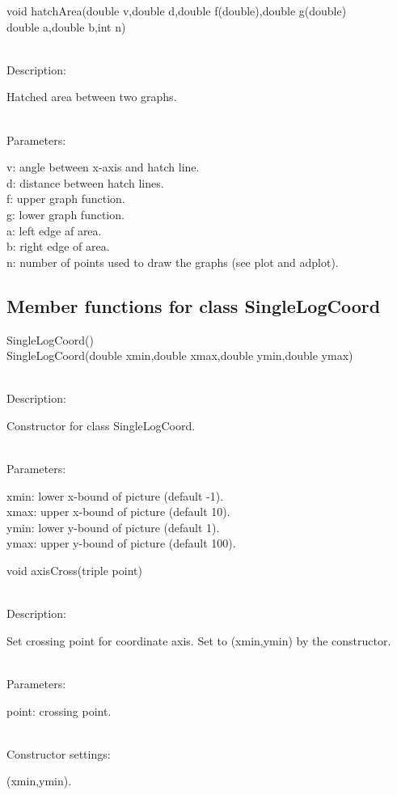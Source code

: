 \documentclass[12pt,a4paper]{article}
\newcommand{\memberitem}[1]{
                              \vspace{-0.5pc}
                              \end{minipage}\\
                              \phantom{M}#1:\\
                              \phantom{MM}
                              \begin{minipage}[t]{12cm}

                           }
\newcommand{\memdsc}{\memberitem{Description}}
\newcommand{\meminp}{\memberitem{Parameters}}
\newcommand{\memdef}{\memberitem{Constructor settings}}
\newenvironment{MemberDescr}
  {
    \begin{minipage}{15cm}
    \bf
  }
  {
    \end{minipage}
  }
\begin{document}
  \begin{MemberDescr}
    void hatchArea(double v,double d,double f(double),double g(double)\\
    \phantom{void hatchArea(}double a,double b,int n)\\
    \memdsc
      Hatched area between two graphs.\\
    \meminp
      v: angle between x-axis and hatch line.\\
      d: distance between hatch lines.\\
      f: upper graph function.\\
      g: lower graph function.\\
      a: left edge af area.\\
      b: right edge of area.\\
      n: number of points used to draw the graphs (see plot and adplot).\\
  \end{MemberDescr}

  \subsection{Member functions for class SingleLogCoord}

  \begin{MemberDescr}
    SingleLogCoord()\\
    SingleLogCoord(double xmin,double xmax,double ymin,double ymax)\\
    \memdsc
      Constructor for class SingleLogCoord.\\
    \meminp
      xmin: lower x-bound of picture (default -1).\\
      xmax: upper x-bound of picture (default 10).\\
      ymin: lower y-bound of picture (default 1).\\
      ymax: upper y-bound of picture (default 100).\\
  \end{MemberDescr}

  \begin{MemberDescr}
    void axisCross(triple point)\\
    \memdsc
      Set crossing point for coordinate axis. Set to (xmin,ymin) by
      the constructor.\\
    \meminp
      point: crossing point.\\
    \memdef
      (xmin,ymin).\\
  \end{MemberDescr}
\end{document}
